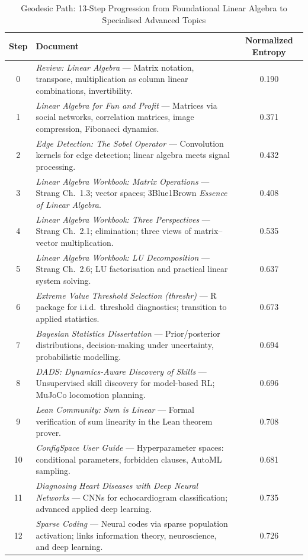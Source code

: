 \begin{table}[htbp]
\centering
\small
\caption{Geodesic Path: 13-Step Progression from Foundational Linear Algebra to Specialised Advanced Topics}
\label{tab:geodesic_path}
\begin{tabular}{cp{10cm}c}
\toprule
Step & Document & Normalized Entropy \\
\midrule
0 & \textit{Review: Linear Algebra} --- Matrix notation, transpose, multiplication as column linear combinations, invertibility. & 0.190 \\
1 & \textit{Linear Algebra for Fun and Profit} --- Matrices via social networks, correlation matrices, image compression, Fibonacci dynamics. & 0.371 \\
2 & \textit{Edge Detection: The Sobel Operator} --- Convolution kernels for edge detection; linear algebra meets signal processing. & 0.432 \\
3 & \textit{Linear Algebra Workbook: Matrix Operations} --- Strang Ch.~1.3; vector spaces; 3Blue1Brown \textit{Essence of Linear Algebra}. & 0.408 \\
4 & \textit{Linear Algebra Workbook: Three Perspectives} --- Strang Ch.~2.1; elimination; three views of matrix--vector multiplication. & 0.535 \\
5 & \textit{Linear Algebra Workbook: LU Decomposition} --- Strang Ch.~2.6; LU factorisation and practical linear system solving. & 0.637 \\
6 & \textit{Extreme Value Threshold Selection (threshr)} --- R package for i.i.d.\ threshold diagnostics; transition to applied statistics. & 0.673 \\
7 & \textit{Bayesian Statistics Dissertation} --- Prior/posterior distributions, decision-making under uncertainty, probabilistic modelling. & 0.694 \\
8 & \textit{DADS: Dynamics-Aware Discovery of Skills} --- Unsupervised skill discovery for model-based RL; MuJoCo locomotion planning. & 0.696 \\
9 & \textit{Lean Community: Sum is Linear} --- Formal verification of sum linearity in the Lean theorem prover. & 0.708 \\
10 & \textit{ConfigSpace User Guide} --- Hyperparameter spaces: conditional parameters, forbidden clauses, AutoML sampling. & 0.681 \\
11 & \textit{Diagnosing Heart Diseases with Deep Neural Networks} --- CNNs for echocardiogram classification; advanced applied deep learning. & 0.735 \\
12 & \textit{Sparse Coding} --- Neural codes via sparse population activation; links information theory, neuroscience, and deep learning. & 0.726 \\
\bottomrule
\end{tabular}
\end{table}
